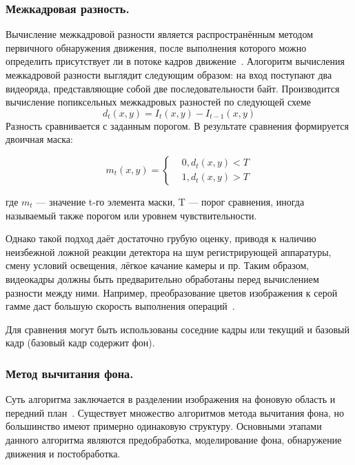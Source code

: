 \subsubsection{Межкадровая разность. }
\label{sub:domain:motion_detect:frames_diff_method}
Вычисление межкадровой разности является распространённым методом первичного обнаружения движения, после выполнения которого можно определить присутствует ли в потоке кадров движение~\cite{md_1998}. Алогоритм вычисления межкадровой разности выглядит следующим образом: на вход поступают два видеоряда, представляющие собой две последовательности
байт. Производится вычисление попиксельных межкадровых разностей по следующей схеме
\begin{equation}\label{eq:frames_diff}
d_t\left(x,y\right) = I_t\left(x,y\right) - I_{t-1}\left(x,y\right)
\end{equation}
Разность сравнивается с заданным порогом. В результате сравнения формируется двоичная маска:

\begin{equation}\label{eq:fr_diff_bitmask}
m_t\left(x,y\right) = 
\begin{cases}
 & 0, {d}_{t}\left(x,y\right)<T  \\ 
 & 1, {d}_{t}\left(x,y\right)>T
\end{cases}
\end{equation}

где $m_t$ --- значение t-го элемента маски, T --- порог сравнения, иногда называемый также порогом или уровнем чувствительности.

Однако такой подход даёт достаточно грубую оценку, приводя к наличию неизбежной ложной реакции детектора на шум регистрирующей аппаратуры, смену условий освещения, лёгкое качание камеры и пр. Таким образом, видеокадры должны быть предварительно обработаны перед вычислением разности между ними. Например, преобразование цветов изображения к серой гамме даст большую скорость выполнения операций~\cite{soyfer_1996}.

Для сравнения могут быть использованы соседние кадры или текущий и базовый кадр (базовый кадр содержит фон).

\subsubsection{Метод вычитания фона. }
\label{sub:domain:motion_detect:back_remove_method}
Суть алгоритма заключается в разделении изображения на фоновую область и передний план~\cite{fisher_2002}.
Существует множество алгоритмов метода вычитания фона, но большинство имеют примерно одинаковую структуру.
Основными этапами данного алгоритма являются предобработка, моделирование фона, обнаружение движения и постобработка.

